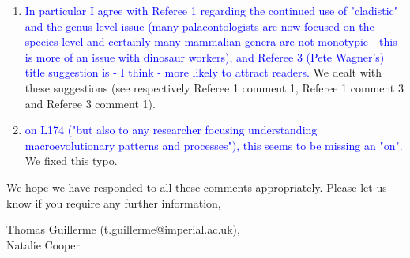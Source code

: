 \documentclass[12pt,letterpaper]{article}
\begin{document}
\begin{enumerate}

\item{\textcolor{blue}{In particular I agree with Referee 1 regarding the continued use of "cladistic" and the genus-level issue (many palaeontologists are now focused on the species-level and certainly many mammalian genera are not monotypic - this is more of an issue with dinosaur workers), and Referee 3 (Pete Wagner's) title suggestion is - I think - more likely to attract readers.}}
We dealt with these suggestions (see respectively Referee 1 comment 1, Referee 1 comment 3 and Referee 3 comment 1).


\item{\textcolor{blue}{on L174 ("but also to any researcher focusing understanding macroevolutionary patterns and processes"), this seems to be missing an "on".}}
We fixed this typo.
\end{enumerate}


We hope we have responded to all these comments appropriately. Please let us know if you require any further information,\\
\bigskip


Thomas Guillerme (t.guillerme@imperial.ac.uk),\\
Natalie Cooper
\end{document}
